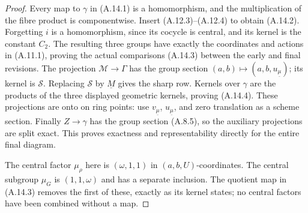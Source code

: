 \begin{proof}
Every map to $\gamma$ in (A.14.1) is a homomorphism, and the
multiplication of the fibre product is componentwise. Insert
(A.12.3)--(A.12.4) to obtain (A.14.2). Forgetting $i$ is a
homomorphism, since its cocycle is central, and its kernel is the
constant $C_2$. The resulting three groups have exactly the
coordinates and actions in (A.11.1), proving the actual comparisons
(A.14.3) between the early and final revisions.
The projection $\mathcal M\to\Gamma$ has the group section
$(a,b)\mapsto(a,b,u_{\underline\mu})$; its kernel is $\mathcal S$.
Replacing $\mathcal S$ by $\underline M$ gives the sharp row.
Kernels over $\gamma$ are the products of the three displayed
geometric kernels, proving (A.14.4). These projections are onto
on ring points: use $v_{\underline\mu}$, $u_{\underline\mu}$, and
zero translation as a scheme section. Finally $Z\to\gamma$ has
the group section (A.8.5), so the auxiliary projections are split
exact. This proves exactness and representability directly for the
entire final diagram.

The central factor $\mu_\rho$ here is $(\omega,1,1)$ in
$(a,b,U)$-coordinates. The central subgroup $\mu_G$ is
$(1,1,\omega)$ and has a separate inclusion. The quotient map
in (A.14.3) removes the first of these, exactly as its kernel states;
no central factors have been combined without a map.
\end{proof}

